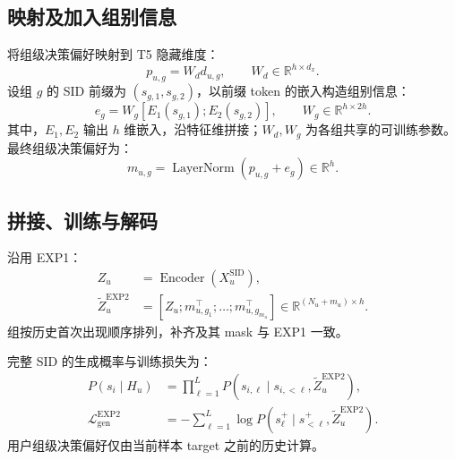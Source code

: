 \documentclass[UTF8,11pt,a4paper]{ctexart}
\begin{document}
\subsection{映射及加入组别信息}

将组级决策偏好映射到 T5 隐藏维度：
\begin{equation}
 p_{u,g}=W_d d_{u,g},\qquad
 W_d\in\mathbb R^{h\times d_x}.
\end{equation}
设组 $g$ 的 SID 前缀为 $(s_{g,1},s_{g,2})$，以前缀 token 的嵌入构造组别信息：
\begin{equation}
 e_g=W_g[E_1(s_{g,1});E_2(s_{g,2})],\qquad
 W_g\in\mathbb R^{h\times 2h}.
\end{equation}
其中，$E_1,E_2$ 输出 $h$ 维嵌入，沿特征维拼接；$W_d,W_g$ 为各组共享的可训练参数。最终组级决策偏好为：
\begin{equation}
 m_{u,g}=\operatorname{LayerNorm}(p_{u,g}+e_g)
 \in\mathbb R^h.
\end{equation}

\subsection{拼接、训练与解码}

沿用 EXP1：
\begin{align}
 Z_u&=\operatorname{Encoder}(X_u^{\mathrm{SID}}),\\
 \widetilde Z_u^{\mathrm{EXP2}}
 &=[Z_u;m_{u,g_1}^{\top};\ldots;m_{u,g_{m_u}}^{\top}]
 \in\mathbb R^{(N_u+m_u)\times h}.
\end{align}
组按历史首次出现顺序排列，补齐及其 mask 与 EXP1 一致。

完整 SID 的生成概率与训练损失为：
\begin{align}
 P(s_i\mid H_u)
 &=\prod_{\ell=1}^{L}
 P(s_{i,\ell}\mid s_{i,<\ell},\widetilde Z_u^{\mathrm{EXP2}}),\\
 \mathcal L_{\mathrm{gen}}^{\mathrm{EXP2}}
 &=-\sum_{\ell=1}^{L}
 \log P(s_\ell^+\mid s_{<\ell}^+,\widetilde Z_u^{\mathrm{EXP2}}).
\end{align}
用户组级决策偏好仅由当前样本 target 之前的历史计算。
\end{document}
